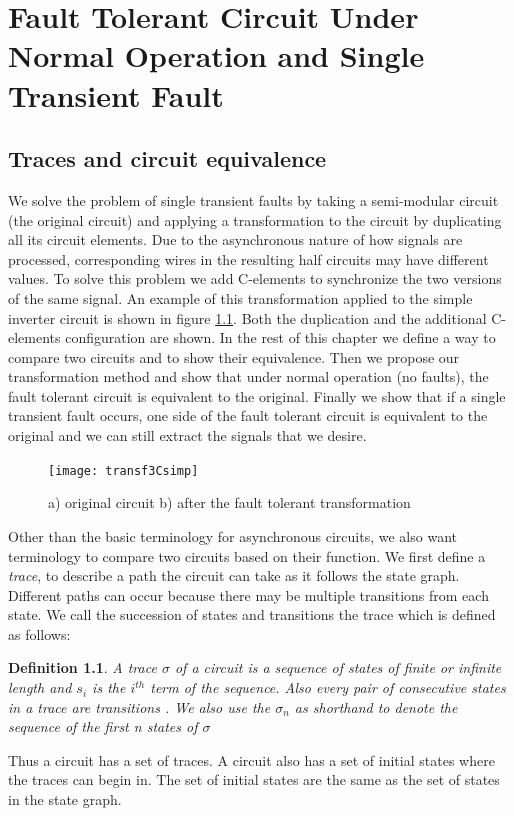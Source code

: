 \documentclass[12pt]{report}
\newtheorem*{definition}{Definition}
\begin{document}
\chapter{Fault Tolerant Circuit Under Normal Operation and Single Transient Fault}
\section{Traces and circuit equivalence}
We solve the problem of single transient faults by taking a semi-modular circuit (the original circuit) and applying a transformation to the circuit by duplicating all its circuit elements.  Due to the asynchronous nature of how signals are processed, corresponding wires in the resulting half circuits may have different values.  To solve this problem we add C-elements to synchronize the two versions of the same signal.   An example of this transformation applied to the simple inverter circuit is shown in figure \ref{fig:dupschemeex}.  Both the duplication and the additional C-elements configuration are shown.  In the rest of this chapter we define a way to compare two circuits and to show their equivalence.  Then we propose our transformation method and show that under normal operation (no faults), the fault tolerant circuit is equivalent to the original.  Finally we show that if a single transient fault occurs, one side of the fault tolerant circuit is equivalent to the original and we can still extract the signals that we desire.\\
\begin{figure}
  \centering
    \texttt{[image: transf3Csimp]}
  \caption{a) original circuit b) after the fault tolerant transformation}
  \label{fig:dupschemeex}
\end{figure}

Other than the basic terminology for asynchronous circuits, we also want terminology to compare two circuits based on their function.  
We first define a {\em trace}, to describe a path the circuit can take as it follows the state graph.  Different paths can occur because there may be multiple transitions from each state.  We call the succession of states and transitions the trace which is defined as follows:
\begin{definition}A {\em trace} $\sigma$ of a circuit is a sequence of states of finite or infinite length and $s_i$ is the $i^{th}$ term of the sequence.  %
 Also every pair of consecutive states in a trace are transitions%
 .  We also use the $\sigma_n$ as shorthand to denote the sequence of the first n states of $\sigma$\end{definition} 
Thus a circuit has a set of traces.  
A circuit also has a set of initial states where the traces can begin in.  The set of initial states are the same as the set of states in the state graph.\\
\end{document}
